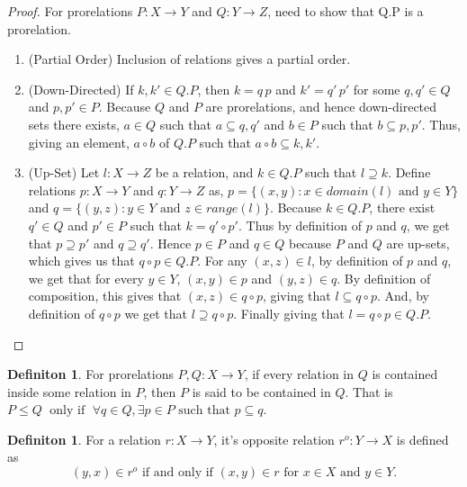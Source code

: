 \documentclass[18pt,a4paper]{article}
\theoremstyle{definition}
\newtheorem{definition}[theorem]{Definiton}
\begin{document}
\begin{proof}\setcounter{equation}{0}

	For prorelations $P:X \to Y$ and $Q:Y \to Z$, need to show that Q.P is a prorelation.
	\begin{enumerate}[label=(\roman*)]
		\item (Partial Order) Inclusion of relations gives a partial order.
		\item (Down-Directed) If $k,k' \in Q.P$, then $k=q\,p$ and $k'=q'\,p'$ for some
		$q,q' \in Q$ and $p,p' \in P$. Because $Q$ and $P$ are prorelations,
		and hence down-directed sets there exists, $a \in Q$ such that
		$ a\subseteq q,q'$ and $b \in P$ such that $b \subseteq p,p'$. Thus,
		giving an element, $a\circ b$ of $Q.P$ such that $a \circ b \subseteq k, k'$.
	\item (Up-Set) Let $l:X \to Z$ be a relation, and $k \in Q.P$ such that $l \supseteq k$.
		Define relations $ p:X \to Y $ and $q:Y \to Z$ as,
		$p=\{(x,y): x \in domain(l) \text{ and } y \in Y\}$ and
		$q=\{(y,z):  y \in Y \text{ and } z \in range(l)\}$.
		Because $k\in Q.P$, there exist $q'\in Q$ and $p' \in P$ such that
		$k = q' \circ p'$. Thus by definition of $p$ and $q$, we get that
		$p \supseteq p'$ and $q \supseteq q'$. Hence $p \in P$ and $q \in Q$ because
		$P$ and $Q$ are up-sets, which gives us that $q\circ p \in Q.P$.
		For any $(x,z) \in l$, by definition
		of $p$ and $q$, we get that for every $y \in Y$, $(x,y) \in p$ and
		$(y,z) \in q $. By
		definition of composition, this gives that $(x,z) \in q \circ p$,
		giving that $l \subseteq q \circ p$. And, by definition
		of $q \circ p$ we get that $l \supseteq q \circ p$. Finally giving that
		$l=q \circ p \in Q.P$. \qedhere
	\end{enumerate}
\end{proof}
\begin{definition} %
	For prorelations $P,Q:X\to Y$, if every relation in $Q$ is contained inside some
	relation in $P$, then $P$ is said to be contained in $Q$.
	That is $P \leq Q \;\text{ only if }\;
	\forall q \in Q, \exists p \in P \text{ such that } p \subseteq q$.
\end{definition}
\begin{definition} %
	For a relation $r:X \to Y$, it's opposite relation $r^o:Y \to X$ is defined as
	\[ (y,x) \in r^o \text{ if and only if } (x,y)\in r  \text{ for } x\in X \text{ and }
	y \in Y.\]
\end{definition}
\end{document}
